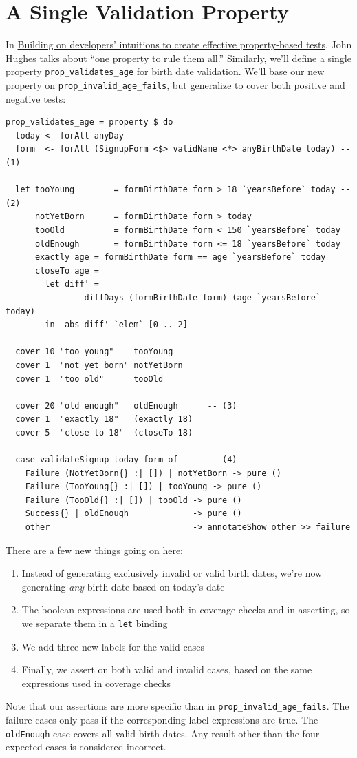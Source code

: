 \section{A Single Validation
Property}\label{a-single-validation-property}

In \href{https://www.youtube.com/watch?v=NcJOiQlzlXQ}{Building on
developers' intuitions to create effective property-based tests}, John
Hughes talks about ``one property to rule them all.'' Similarly, we'll
define a single property \texttt{prop\_validates\_age} for birth date
validation. We'll base our new property on
\texttt{prop\_invalid\_age\_fails}, but generalize to cover both
positive and negative tests:

\begin{verbatim}
prop_validates_age = property $ do
  today <- forAll anyDay
  form  <- forAll (SignupForm <$> validName <*> anyBirthDate today) -- (1)

  let tooYoung        = formBirthDate form > 18 `yearsBefore` today -- (2)
      notYetBorn      = formBirthDate form > today
      tooOld          = formBirthDate form < 150 `yearsBefore` today
      oldEnough       = formBirthDate form <= 18 `yearsBefore` today
      exactly age = formBirthDate form == age `yearsBefore` today
      closeTo age =
        let diff' =
                diffDays (formBirthDate form) (age `yearsBefore` today)
        in  abs diff' `elem` [0 .. 2]

  cover 10 "too young"    tooYoung
  cover 1  "not yet born" notYetBorn
  cover 1  "too old"      tooOld

  cover 20 "old enough"   oldEnough      -- (3)
  cover 1  "exactly 18"   (exactly 18)
  cover 5  "close to 18"  (closeTo 18)

  case validateSignup today form of      -- (4)
    Failure (NotYetBorn{} :| []) | notYetBorn -> pure ()
    Failure (TooYoung{} :| []) | tooYoung -> pure ()
    Failure (TooOld{} :| []) | tooOld -> pure ()
    Success{} | oldEnough             -> pure ()
    other                             -> annotateShow other >> failure
\end{verbatim}
There are a few new things going on here:

\begin{enumerate}
\def\labelenumi{\arabic{enumi}.}

\item
  Instead of generating exclusively invalid or valid birth dates, we're
  now generating \emph{any} birth date based on today's date
\item
  The boolean expressions are used both in coverage checks and in
  asserting, so we separate them in a \texttt{let} binding
\item
  We add three new labels for the valid cases
\item
  Finally, we assert on both valid and invalid cases, based on the same
  expressions used in coverage checks
\end{enumerate}
Note that our assertions are more specific than in
\texttt{prop\_invalid\_age\_fails}. The failure cases only pass if the
corresponding label expressions are true. The \texttt{oldEnough} case
covers all valid birth dates. Any result other than the four expected
cases is considered incorrect.

